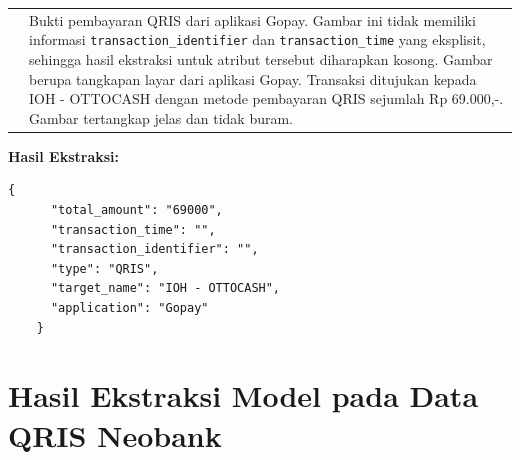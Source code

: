 \begin{table}[h!]
\begin{tabularx}{\textwidth}{m{} X}
        & 
        Bukti pembayaran QRIS dari aplikasi Gopay. Gambar ini tidak memiliki informasi \texttt{transaction\_identifier} dan \texttt{transaction\_time} yang eksplisit, sehingga hasil ekstraksi untuk atribut tersebut diharapkan kosong. Gambar berupa tangkapan layar dari aplikasi Gopay. Transaksi ditujukan kepada IOH - OTTOCASH dengan metode pembayaran QRIS sejumlah Rp 69.000,-. Gambar tertangkap jelas dan tidak buram. \\
    \end{tabularx}
\end{table}

\textbf{Hasil Ekstraksi:}
\begin{lstlisting}[style=jsonstyle]
    {
      "total_amount": "69000",
      "transaction_time": "",
      "transaction_identifier": "",
      "type": "QRIS",
      "target_name": "IOH - OTTOCASH",
      "application": "Gopay"
    }
\end{lstlisting}

\clearpage

\section{Hasil Ekstraksi Model pada Data QRIS Neobank}

